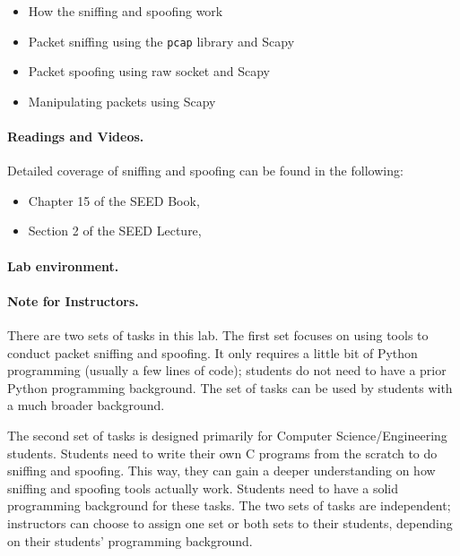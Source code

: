 \begin{itemize}[noitemsep]
\item How the sniffing and spoofing work
\item Packet sniffing using the {\tt pcap} library and Scapy
\item Packet spoofing using raw socket and Scapy
\item Manipulating packets using Scapy 
\end{itemize}



\paragraph{Readings and Videos.}
Detailed coverage of sniffing and spoofing can be found in
the following:

\begin{itemize}
\item Chapter 15 of the SEED Book, \seedbook

\item Section 2 of the SEED Lecture, \seedisvideo
\end{itemize}



\paragraph{Lab environment.} \seedenvironment



\paragraph{Note for Instructors.}
There are two sets of tasks in this lab. The first set focuses on using 
tools to conduct packet sniffing and spoofing. It only requires a
little bit of Python programming (usually a few lines of code); students do
not need to have a prior Python programming background. 
The set of tasks can be used by students with a much broader background.

The second set of tasks is designed primarily for Computer Science/Engineering students.
Students need to write their own C programs from the scratch to do sniffing 
and spoofing. This way, they can gain a deeper understanding 
on how sniffing and spoofing tools actually work. Students 
need to have a solid programming background for these tasks.
The two sets of tasks are independent; instructors can choose to
assign one set or both sets to their students, depending on 
their students' programming background.


